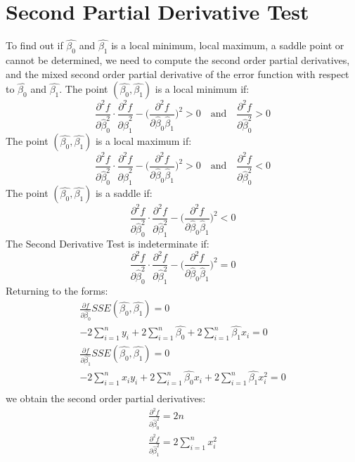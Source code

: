 \documentclass{article}
\begin{document}
\section*{Second Partial Derivative Test}

To find out if $\hat{\beta_0}$ and $\hat{\beta_1}$ is a local minimum, local maximum, a saddle point or cannot be determined, we need to compute the second order partial derivatives, and the mixed second order partial derivative of the error function with respect to  $\hat{\beta_0}$ and $\hat{\beta_1}$. The point $(\hat{\beta_{0}}, \hat{\beta_{1}})$ is a local minimum if:
$$
\frac{\partial^2f}{\partial \hat{\beta}_{0}^2} \cdot \frac{\partial^2f}{\partial \hat{\beta}_{1}^2} - \Bigg( \frac{\partial^2f}{\partial \hat{\beta}_{0} \hat{\beta}_{1}}\Bigg)^2 > 0  \quad \textrm{and} \quad \frac{\partial^2f}{\partial \hat{\beta}_{0}^2} > 0
$$
The point $(\hat{\beta_{0}}, \hat{\beta_{1}})$ is a local maximum if:
$$
\frac{\partial^2f}{\partial \hat{\beta}_{0}^2} \cdot \frac{\partial^2f}{\partial \hat{\beta}_{1}^2} - \Bigg( \frac{\partial^2f}{\partial \hat{\beta}_{0} \hat{\beta}_{1}}\Bigg)^2 > 0  \quad \textrm{and} \quad \frac{\partial^2f}{\partial \hat{\beta}_{0}^2} < 0
$$
The point $(\hat{\beta_{0}}, \hat{\beta_{1}})$ is a saddle if:
$$
\frac{\partial^2f}{\partial \hat{\beta}_{0}^2} \cdot \frac{\partial^2f}{\partial \hat{\beta}_{1}^2} - \Bigg( \frac{\partial^2f}{\partial \hat{\beta}_{0} \hat{\beta}_{1}}\Bigg)^2 < 0 
$$
The Second Derivative Test is indeterminate if:
$$
\frac{\partial^2f}{\partial \hat{\beta}_{0}^2} \cdot \frac{\partial^2f}{\partial \hat{\beta}_{1}^2} - \Bigg( \frac{\partial^2f}{\partial \hat{\beta}_{0} \hat{\beta}_{1}}\Bigg)^2 = 0 
$$
Returning to the forms:
\begin{gather*}
\frac{\partial f}{\partial \hat{\beta_0}}SSE(\hat{\beta_0}, \hat{\beta_1}) = 0 \\
 -2\sum_{i=1}^{n}y_i  + 2\sum_{i=1}^{n}\hat{\beta_{0}} + 2\sum_{i=1}^{n}\hat{\beta_{1}}x_i  = 0 \\
 \frac{\partial f}{\partial \hat{\beta_1}}SSE(\hat{\beta_0}, \hat{\beta_1}) = 0 \\
 -2\sum_{i=1}^{n}x_i y_i + 2\sum_{i=1}^{n}\hat{\beta_{0}}x_i + 2\sum_{i=1}^{n}\hat{\beta_{1}}x_i^2 = 0 \\
\end{gather*}
we obtain the second order partial derivatives:
\begin{gather*}
\frac{\partial^2f}{\partial \hat{\beta}_{0}^2} = 2n \\
\frac{\partial^2f}{\partial \hat{\beta}_{1}^2} = 2\sum_{i=1}^{n}x_i^2 \\
\end{gather*}
\end{document}
